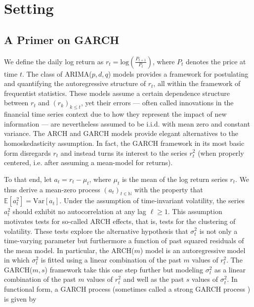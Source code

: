 \documentclass[11pt]{article}
\def\mrm#1{\mathrm{#1}} %
\def\E{\mathbb{E}} %
\theoremstyle{definition}
\begin{document}
\section{Setting}
\label{section2}

\subsection{A Primer on GARCH}
We define the daily log return as $r_{t} = \text{log}(\frac{P_{t+1}}{P_{t}})$, where $P_{t}$ denotes the price at time $t$.  The class of ARIMA($p,d,q$) models  \citep{box2013box} provides a framework for postulating and quantifying the autoregressive structure of $r_{t}$, all within the framework of frequentist statistics.  These models assume a certain dependence structure between $r_{t}$ and $(r_{k})_{k\leq t}$, yet their errors --- often called innovations in the financial time series context due to how they represent the impact of new information --- are nevertheless assumed to be i.i.d. with mean zero and constant variance.  The ARCH \citep{engle1982autoregressive} and GARCH \citep{bollerslev1986generalized} models provide elegant alternatives to the homoskedasticity assumption.  In fact, the GARCH framework in its most basic form disregards $r_{t}$ and instead turns its interest to the series $r_{t}^{2}$ (when properly centered, i.e. after assuming a mean-model for returns).  

To that end, let $a_{t} = r_{t} - \mu_{t}$, where $\mu_{t}$ is the mean of the log return series $r_{t}$.  We thus derive a mean-zero process $(a_{t})_{t\in\mathbb{N}}$ with the property that $\E[a^{2}_{t}] = \mrm{Var}[a_{t}]$.  Under the assumption of time-invariant volatility, the series $a_{t}^{2}$ should exhibit no autocorrelation at any lag $\ell\geq1$.  This assumption motivates tests for so-called ARCH effects, that is, tests for the clustering of volatility.  These tests explore the alternative hypothesis that $\sigma_{t}^{2}$ is not only a time-varying parameter but furthermore a function of past squared residuals of the mean model.  In particular, the ARCH($m$) model is an autoregressive model in which $\sigma_{t}^{2}$ is fitted using a linear combination of the past $m$ values of $r_{t}^{2}$.  The GARCH($m,s$) framework take this one step further but modeling $\sigma_{t}^{2}$ as a linear combination of the past $m$ values of $r_{t}^{2}$ and well as the past $s$ values of $\sigma_{t}^{2}$.  In functional form, a GARCH process (sometimes called a strong GARCH process \citep[p. 19]{francq2019garch}) is given by
\end{document}
